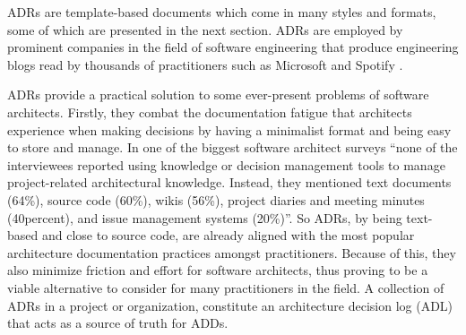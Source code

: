         ADRs are template-based documents which come in many styles and formats, some of which are presented in the next section. ADRs are employed by prominent companies in the field of software engineering that produce engineering blogs read by thousands of practitioners such as Microsoft and Spotify \cite{Spotify_ADRS, microsoftArchitectureDecision}. 
        
        ADRs provide a practical solution to some ever-present problems of software architects. Firstly, they combat the documentation fatigue that architects experience when making decisions by having a minimalist format and being easy to store and manage. In one of the biggest software architect surveys \cite{architect_survey2} ``none of the interviewees reported using knowledge or decision management tools to manage project-related architectural knowledge. Instead, they mentioned text documents (64\%), source code (60\%), wikis (56\%), project diaries and meeting minutes (40percent), and issue management systems (20\%)''. So ADRs, by being text-based and close to source code, are already aligned with the most popular architecture documentation practices amongst practitioners. Because of this, they also minimize friction and effort for software architects, thus proving to be a viable alternative to consider for many practitioners in the field. A collection of ADRs in a project or organization, constitute an architecture decision log (ADL) that acts as a source of truth for ADDs.
        
